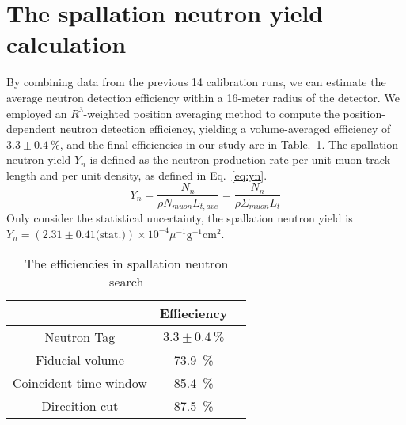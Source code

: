 \section{The spallation neutron yield calculation}
By combining data from the previous 14 calibration runs, we can estimate the average neutron detection efficiency within a 16-meter radius of the detector. We employed an $R^3$-weighted position averaging method to compute the position-dependent neutron detection efficiency, yielding a volume-averaged efficiency of $3.3\pm\SI{0.4}{\%}$, and the final efficiencies in our study are in Table.~\ref{tab:spn_eff}.
The spallation neutron yield $Y_n$ is defined as the neutron production rate per unit muon track length and per unit density, as defined in Eq.~\eqref{eq:yn}.
\begin{equation}
	\label{eq:yn}
	Y_n = \frac{N_n}{\rho N_{muon}L_{t,ave}}= \frac{N_n}{\rho \Sigma_{muon} L_t}
\end{equation}
Only consider the statistical uncertainty, the spallation neutron yield is $Y_n = (2.31\pm0.41 \text{(stat.)})\times 10^{-4} \mu^{-1}\text{g}^{-1}\text{cm}^2$.
\begin{table}[H]
	\caption{The efficiencies in spallation neutron search}%
	\label{tab:spn_eff}
	\centering%
	\begin{tabular}{ccc}
		\toprule%
		                       & Effieciency          \\
		\midrule%
		Neutron Tag            & $3.3\pm\SI{0.4}{\%}$ \\
		Fiducial volume        & \SI{73.9}{\%}        \\
		Coincident time window & \SI{85.4}{\%}        \\
		Direcition cut         & \SI{87.5}{\%}        \\
		\bottomrule
	\end{tabular}
\end{table}


